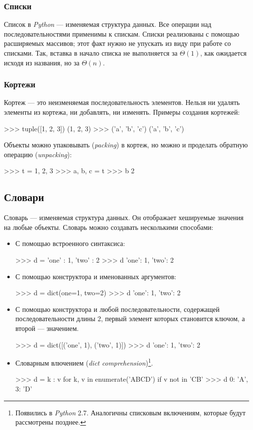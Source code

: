 \subsubsection{Списки}
Список в \emph{Python} — изменяемая структура данных. Все операции над последовательностями применимы к спискам. Списки реализованы с помощью расширяемых массивов; этот факт нужно не упускать из виду при работе со списками. Так, вставка в начало списка не выполняется за $\Theta(1)$, как ожидается исходя из названия, но за $\Theta(n)$.

\subsubsection{Кортежи}
Кортеж — это неизменяемая последовательность элементов. Нельзя ни удалять элементы из кортежа, ни добавлять, ни изменять. Примеры создания кортежей:
\begin{pylst}{}{}
>>> tuple([1, 2, 3])
(1, 2, 3)
>>> ('a', 'b', 'c')
('a', 'b', 'c')
\end{pylst}

Объекты можно упаковывать (\emph{packing}) в кортеж, но можно и проделать обратную операцию (\emph{unpacking}):
\begin{pylst}{}{}
>>> t = 1, 2, 3
>>> a, b, c = t
>>> b
2
\end{pylst}

\subsection{Словари}
Словарь — изменяемая структура данных. Он отображает хешируемые значения на любые объекты. Словарь можно создавать несколькими способами:
\begin{itemize}
  \item С помощью встроенного синтаксиса:
\begin{pylst}{}{}
>>> d = { 'one' : 1, 'two' : 2 }
>>> d
{'one': 1, 'two': 2}
\end{pylst}

  \item С помощью конструктора и именованных аргументов:
\begin{pylst}{}{}
>>> d = dict(one=1, two=2)
>>> d
{'one': 1, 'two': 2}
\end{pylst}

  \item С помощью конструктора и любой последовательности, содержащей последовательности длины $2$, первый элемент которых становится ключом, а второй — значением.
\begin{pylst}{}{}
>>> d = dict([('one', 1), ('two', 1)])
>>> d
{'one': 1, 'two': 2}
\end{pylst}

  \item Словарным влючением (\emph{dict comprehension})\footnote{Появились в \emph{Python} 2.7. Аналогичны списковым включениям, которые будут рассмотрены позднее.}.
\begin{pylst}{}{}
>>> d = { k : v for k, v in enumerate('ABCD') if v not in 'CB' }
>>> d
{0: 'A', 3: 'D'}
\end{pylst}
\end{itemize}

